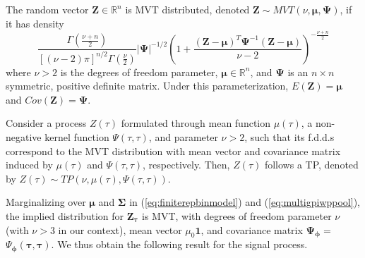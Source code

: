 \begin{definition}
\label{def:defmvtandtp}
The random vector $\mathbf{Z}\in\mathbb{R}^n$ is MVT distributed, denoted 
$\mathbf{Z}\sim MVT(\nu,\boldsymbol{\mu},\boldsymbol{\Psi})$, 
if it has density
\begin{equation*}
\frac{\Gamma(\frac{\nu+n}{2})}{[(\nu-2)\pi]^{n/2}
\Gamma(\frac{\nu}{2})}|\boldsymbol{\Psi}|^{-1/2}
\left(
1 + \frac{(\mathbf{Z}-\boldsymbol{\mu})^T\boldsymbol{\Psi}^{-1}
(\mathbf{Z}-\boldsymbol{\mu})}{\nu-2} \right)^{-\frac{\nu+n}{2}}
\label{eq:defmvt}
\end{equation*}
where $\nu > 2$ is the degrees of freedom parameter, $\boldsymbol{\mu}\in\mathbb{R}^n$,
and $\boldsymbol{\Psi}$ is an $n\times n$ symmetric, positive definite matrix.
Under this parameterization, $E(\mathbf{Z})=\boldsymbol{\mu}$ 
and $Cov(\mathbf{Z})=\boldsymbol{\Psi}$. 

Consider a process $Z(\tau)$ formulated through mean function $\mu(\tau)$, a 
non-negative kernel function $\Psi(\tau,\tau)$, and parameter $\nu>2$, such that its 
f.d.d.s correspond to the MVT distribution with mean vector and covariance matrix induced 
by $\mu(\tau)$ and $\Psi(\tau,\tau)$, respectively. Then, $Z(\tau)$ follows a TP, denoted 
by $Z(\tau)\sim TP(\nu,\mu(\tau),\Psi(\tau,\tau))$.
\end{definition}




Marginalizing over $\boldsymbol{\mu}$ and $\boldsymbol{\Sigma}$
in (\ref{eq:finiterepbinmodel}) and (\ref{eq:multigpiwppool}),
the implied distribution for $\mathbf{Z}_{\boldsymbol{\tau}}$ is MVT, with degrees of 
freedom parameter $\nu$ (with $\nu > 3$ in our context), mean vector $\mu_0 \mathbf{1}$,
and covariance matrix $\boldsymbol{\Psi}_{\boldsymbol{\phi}} =$
$\Psi_{\boldsymbol{\phi}}(\boldsymbol{\tau},\boldsymbol{\tau})$. We thus obtain
the following result for the signal process.

